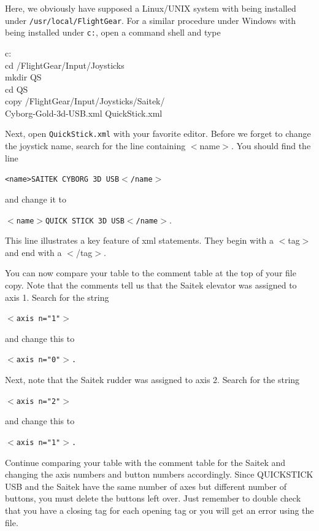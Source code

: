 \noindent
Here, we obviously have supposed a Linux/UNIX system with \FlightGear{} being installed under \texttt{/usr/local/FlightGear}. For a similar procedure under Windows with \FlightGear{} being installed under \texttt{c:\FlightGear}, open a command shell and type
\medskip

\begin{ttfamily}
\noindent
c:\\
cd /FlightGear/Input/Joysticks\\
mkdir QS\\
cd QS\\
copy  /FlightGear/Input/Joysticks/Saitek/\\
Cyborg-Gold-3d-USB.xml  QuickStick.xml
\end{ttfamily}
\medskip

\noindent
Next, open \texttt{QuickStick.xml} with your favorite editor.  Before we forget to change the joystick name, search for the line containing $<$name$>$.  You should find the line
\medskip

\texttt{<name>SAITEK CYBORG 3D USB$<$/name$>$}
\medskip

\noindent
and change it to
\medskip

	\texttt{$<$name$>$QUICK STICK 3D USB$<$/name$>$}.
	\medskip

\noindent
This line illustrates a key feature of xml statements.  They begin with a $<$tag$>$ and end with a $<$/tag$>$.  

You can now compare your table to the comment table at the top of your file copy.  Note that the comments tell us that the Saitek elevator was assigned to axis 1.  Search for the string
\medskip

	\texttt{$<$axis n="1"$>$}
\medskip

\noindent	
and change this to 
\medskip

	\texttt{$<$axis n="0"$>$.}
\medskip	

Next, note that the Saitek rudder was assigned to axis 2.  Search for the string
\medskip

	\texttt{$<$axis n="2"$>$}

\noindent	
and change this to 
\medskip
	
	\texttt{$<$axis n="1"$>$.}
\medskip

\noindent	
Continue comparing your table with the comment table for the Saitek and changing the axis numbers and button numbers accordingly.  Since QUICKSTICK USB and the Saitek have the same number of axes but different number of buttons, you must delete the buttons left over.  Just remember to double check that you have a closing tag for each opening tag or you will get an error using the file.

